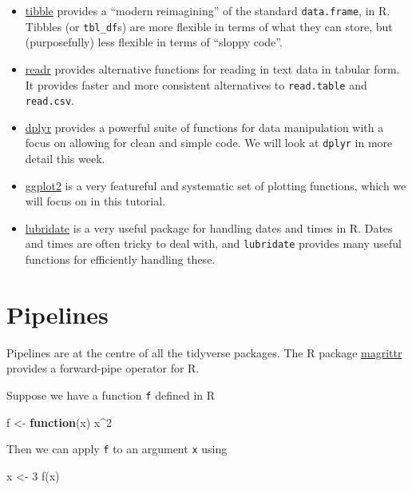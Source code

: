 \documentclass[
]{book}
\newenvironment{Shaded}{\begin{snugshade}}{\end{snugshade}}
\newcommand{\ControlFlowTok}[1]{\textcolor[rgb]{0.13,0.29,0.53}{\textbf{#1}}}
\newcommand{\DecValTok}[1]{\textcolor[rgb]{0.00,0.00,0.81}{#1}}
\newcommand{\FunctionTok}[1]{\textcolor[rgb]{0.00,0.00,0.00}{#1}}
\newcommand{\NormalTok}[1]{#1}
\newcommand{\OtherTok}[1]{\textcolor[rgb]{0.56,0.35,0.01}{#1}}
\newcommand{\SpecialCharTok}[1]{\textcolor[rgb]{0.00,0.00,0.00}{#1}}
\providecommand{\tightlist}{%
  \setlength{\itemsep}{0pt}\setlength{\parskip}{0pt}}
\begin{document}
\begin{itemize}
\tightlist
\item
  \href{http://tibble.tidyverse.org/}{tibble} provides a ``modern reimagining'' of the standard \texttt{data.frame}, in R. Tibbles (or \texttt{tbl\_df}s) are more flexible in terms of what they can store, but (purposefully) less flexible in terms of ``sloppy code''.
\item
  \href{http://readr.tidyverse.org/}{readr} provides alternative functions for reading in text data in tabular form. It provides faster and more consistent alternatives to \texttt{read.table} and \texttt{read.csv}.
\item
  \href{http://dplyr.tidyverse.org/}{dplyr} provides a powerful suite of functions for data manipulation with a focus on allowing for clean and simple code. We will look at \texttt{dplyr} in more detail this week.
\item
  \href{http://ggplot2.tidyverse.org/}{ggplot2} is a very featureful and systematic set of plotting functions, which we will focus on in this tutorial.
\item
  \href{https://lubridate.tidyverse.org/}{lubridate} is a very useful package for handling dates and times in R. Dates and times are often tricky to deal with, and \texttt{lubridate} provides many useful functions for efficiently handling these.
\end{itemize}

\hypertarget{pipelines}{%
\section{Pipelines}\label{pipelines}}

Pipelines are at the centre of all the tidyverse packages. The R package \href{https://cran.r-project.org/web/packages/magrittr/}{magrittr} provides a forward-pipe operator for R.

Suppose we have a function \texttt{f} defined in R

\begin{Shaded}
\begin{Highlighting}[]
\NormalTok{f }\OtherTok{\textless{}{-}} \ControlFlowTok{function}\NormalTok{(x)}
\NormalTok{  x}\SpecialCharTok{\^{}}\DecValTok{2}
\end{Highlighting}
\end{Shaded}

Then we can apply \texttt{f} to an argument \texttt{x} using

\begin{Shaded}
\begin{Highlighting}[]
\NormalTok{x }\OtherTok{\textless{}{-}} \DecValTok{3}
\FunctionTok{f}\NormalTok{(x)}
\end{Highlighting}
\end{Shaded}
\end{document}
